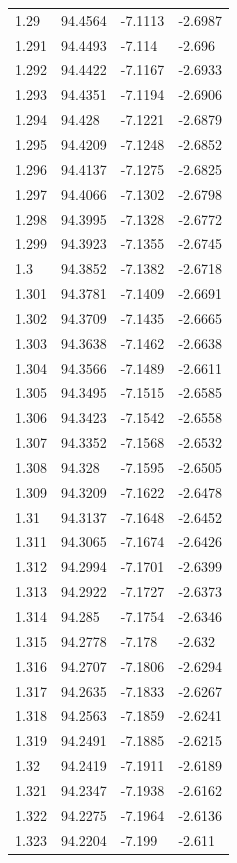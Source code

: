 \begin{tabular}{llll}
1.29 & 94.4564 & -7.1113 & -2.6987 \\
1.291 & 94.4493 & -7.114 & -2.696 \\
1.292 & 94.4422 & -7.1167 & -2.6933 \\
1.293 & 94.4351 & -7.1194 & -2.6906 \\
1.294 & 94.428 & -7.1221 & -2.6879 \\
1.295 & 94.4209 & -7.1248 & -2.6852 \\
1.296 & 94.4137 & -7.1275 & -2.6825 \\
1.297 & 94.4066 & -7.1302 & -2.6798 \\
1.298 & 94.3995 & -7.1328 & -2.6772 \\
1.299 & 94.3923 & -7.1355 & -2.6745 \\
1.3 & 94.3852 & -7.1382 & -2.6718 \\
1.301 & 94.3781 & -7.1409 & -2.6691 \\
1.302 & 94.3709 & -7.1435 & -2.6665 \\
1.303 & 94.3638 & -7.1462 & -2.6638 \\
1.304 & 94.3566 & -7.1489 & -2.6611 \\
1.305 & 94.3495 & -7.1515 & -2.6585 \\
1.306 & 94.3423 & -7.1542 & -2.6558 \\
1.307 & 94.3352 & -7.1568 & -2.6532 \\
1.308 & 94.328 & -7.1595 & -2.6505 \\
1.309 & 94.3209 & -7.1622 & -2.6478 \\
1.31 & 94.3137 & -7.1648 & -2.6452 \\
1.311 & 94.3065 & -7.1674 & -2.6426 \\
1.312 & 94.2994 & -7.1701 & -2.6399 \\
1.313 & 94.2922 & -7.1727 & -2.6373 \\
1.314 & 94.285 & -7.1754 & -2.6346 \\
1.315 & 94.2778 & -7.178 & -2.632 \\
1.316 & 94.2707 & -7.1806 & -2.6294 \\
1.317 & 94.2635 & -7.1833 & -2.6267 \\
1.318 & 94.2563 & -7.1859 & -2.6241 \\
1.319 & 94.2491 & -7.1885 & -2.6215 \\
1.32 & 94.2419 & -7.1911 & -2.6189 \\
1.321 & 94.2347 & -7.1938 & -2.6162 \\
1.322 & 94.2275 & -7.1964 & -2.6136 \\
1.323 & 94.2204 & -7.199 & -2.611 \\

\end{tabular}
